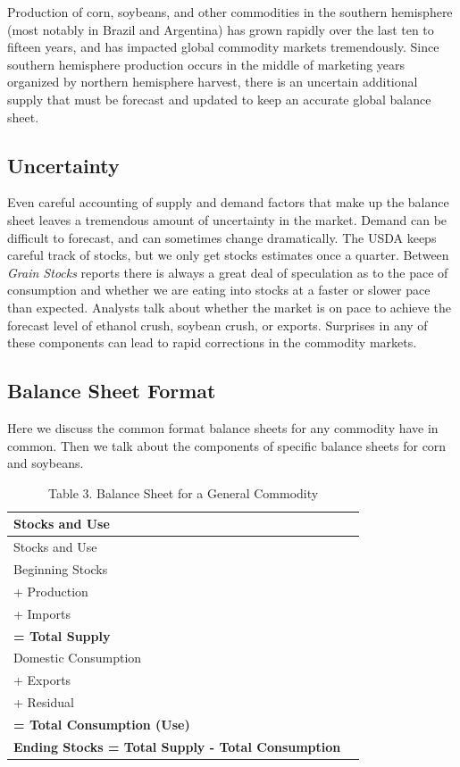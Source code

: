 \documentclass[
  letterpaper,
  DIV=11,
  numbers=noendperiod]{scrreprt}
\begin{document}
Production of corn, soybeans, and other commodities in the southern
hemisphere (most notably in Brazil and Argentina) has grown rapidly over
the last ten to fifteen years, and has impacted global commodity markets
tremendously. Since southern hemisphere production occurs in the middle
of marketing years organized by northern hemisphere harvest, there is an
uncertain additional supply that must be forecast and updated to keep an
accurate global balance sheet.

\subsection{Uncertainty}\label{uncertainty}

Even careful accounting of supply and demand factors that make up the
balance sheet leaves a tremendous amount of uncertainty in the market.
Demand can be difficult to forecast, and can sometimes change
dramatically. The USDA keeps careful track of stocks, but we only get
stocks estimates once a quarter. Between \emph{Grain Stocks} reports
there is always a great deal of speculation as to the pace of
consumption and whether we are eating into stocks at a faster or slower
pace than expected. Analysts talk about whether the market is on pace to
achieve the forecast level of ethanol crush, soybean crush, or exports.
Surprises in any of these components can lead to rapid corrections in
the commodity markets.

\subsection{Balance Sheet Format}\label{balance-sheet-format}

Here we discuss the common format balance sheets for any commodity have
in common. Then we talk about the components of specific balance sheets
for corn and soybeans.

\begin{longtable}[]{@{}ll@{}}
\caption{Table 3. Balance Sheet for a General Commodity}\tabularnewline
\toprule\noalign{}
Stocks and Use & \\
\midrule\noalign{}
\endfirsthead
\toprule\noalign{}
Stocks and Use & \\
\midrule\noalign{}
\endhead
\bottomrule\noalign{}
\endlastfoot
Beginning Stocks & \\
+ Production & \\
+ Imports & \\
\textbf{= Total Supply} & \\
Domestic Consumption & \\
+ Exports & \\
+ Residual & \\
\textbf{= Total Consumption (Use)} & \\
\textbf{Ending Stocks = Total Supply - Total Consumption} & \\
\end{longtable}
\end{document}
